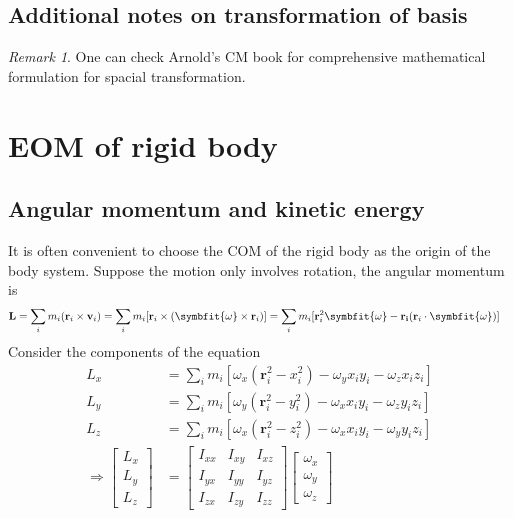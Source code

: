 \documentclass[twoside,9pt]{article}
\numberwithin{equation}{section} %
\theoremstyle{definition}
\theoremstyle{remark}
\newtheorem*{remark}{Remark}
\begin{document}
\subsection*{Additional notes on transformation of basis}
\begin{remark}
One can check Arnold's CM book for comprehensive mathematical formulation
for spacial transformation.
\end{remark}


\newpage
\section{EOM of rigid body}
\subsection{Angular momentum and kinetic energy}
It is often convenient to choose the COM of the rigid body as the origin
of the body system.
Suppose the motion only involves rotation, the angular momentum is
\begin{align}
    \mathbf{L} &= 
    \sum_i m_i (\mathbf{r}_i\times\mathbf{v}_i)
    = \sum_i m_i [\mathbf{r}_i\times(\symbfit{\omega}\times\mathbf{r}_i)]
    = \sum_i m_i[\mathbf{r}_i^2\symbfit{\omega} - \mathbf{r_i}(\mathbf{r}_i
    \cdot\symbfit{\omega})]
\end{align}
Consider the components of the equation
\begin{align}
    L_x &= \sum_i m_i[\omega_x(\mathbf{r}_i^2 - x_i^2) - \omega_yx_iy_i-\omega_z x_iz_i]\\
    L_y &= \sum_i m_i[\omega_y(\mathbf{r}_i^2 - y_i^2) - \omega_xx_iy_i-\omega_z y_iz_i]\\
    L_z &= \sum_i m_i[\omega_x(\mathbf{r}_i^2 - z_i^2) - \omega_xx_iy_i-\omega_y y_iz_i]\\
    \Rightarrow
    \begin{bmatrix}
        L_x\\L_y\\L_z
    \end{bmatrix} &=
    \begin{bmatrix}
        I_{xx} & I_{xy} & I_{xz}\\
        I_{yx} & I_{yy} & I_{yz}\\
        I_{zx} & I_{zy} & I_{zz}
    \end{bmatrix}
    \begin{bmatrix}
        \omega_x\\ \omega_y\\ \omega_z
    \end{bmatrix}
\end{align}
\end{document}
